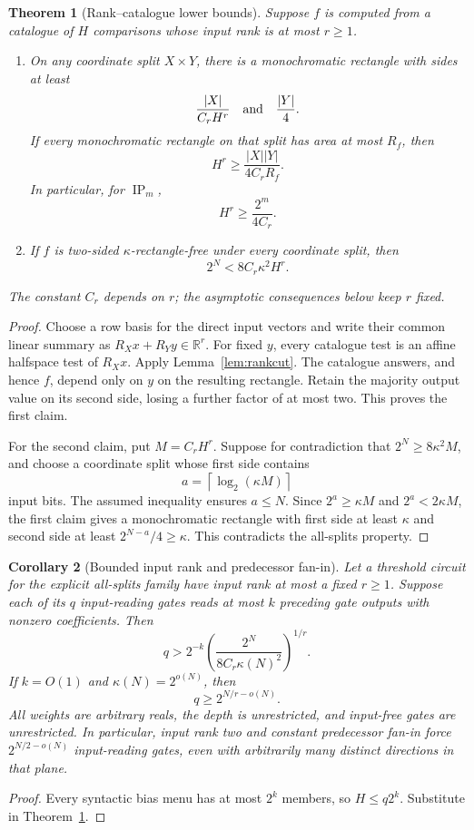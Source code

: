 \documentclass[11pt]{article}
\newtheorem{theorem}{Theorem}[section]
\newtheorem{corollary}[theorem]{Corollary}
\theoremstyle{definition}
\newcommand{\R}{\mathbb R}
\newcommand{\ip}{\operatorname{IP}}
\begin{document}
\begin{theorem}[Rank--catalogue lower bounds]\label{thm:rankcatalogue}
Suppose \(f\) is computed from a catalogue of \(H\) comparisons whose input rank is at most \(r\ge1\).
\begin{enumerate}
 \item On any coordinate split \(X\times Y\), there is a monochromatic rectangle with sides at least
 \[
 \frac{|X|}{C_rH^r}\quad\hbox{and}\quad\frac{|Y|}{4}.
 \]
 If every monochromatic rectangle on that split has area at most \(R_f\), then
 \[
 H^r\ge\frac{|X||Y|}{4C_rR_f}.
 \]
 In particular, for \(\ip_m\),
 \[
 H^r\ge\frac{2^m}{4C_r}.
 \]
 \item If \(f\) is two-sided \(\kappa\)-rectangle-free under every coordinate split, then
 \[
 \boxed{\quad 2^N<8C_r\kappa^2H^r.\quad}
 \]
\end{enumerate}
The constant \(C_r\) depends on \(r\); the asymptotic consequences below keep \(r\) fixed.
\end{theorem}
\begin{proof}
Choose a row basis for the direct input vectors and write their common linear summary as \(R_Xx+R_Yy\in\R^r\). For fixed \(y\), every catalogue test is an affine halfspace test of \(R_Xx\). Apply Lemma~\ref{lem:rankcut}. The catalogue answers, and hence \(f\), depend only on \(y\) on the resulting rectangle. Retain the majority output value on its second side, losing a further factor of at most two. This proves the first claim.

For the second claim, put \(M=C_rH^r\). Suppose for contradiction that \(2^N\ge8\kappa^2M\), and choose a coordinate split whose first side contains
\[
 a=\left\lceil\log_2(\kappa M)\right\rceil
\]
input bits. The assumed inequality ensures \(a\le N\). Since \(2^a\ge\kappa M\) and \(2^a<2\kappa M\), the first claim gives a monochromatic rectangle with first side at least \(\kappa\) and second side at least \(2^{N-a}/4\ge\kappa\). This contradicts the all-splits property.
\end{proof}

\begin{corollary}[Bounded input rank and predecessor fan-in]\label{cor:rankfanin}
Let a threshold circuit for the explicit all-splits family have input rank at most a fixed \(r\ge1\). Suppose each of its \(q\) input-reading gates reads at most \(k\) preceding gate outputs with nonzero coefficients. Then
\[
 q>2^{-k}\left(\frac{2^N}{8C_r\kappa(N)^2}\right)^{1/r}.
\]
If \(k=O(1)\) and \(\kappa(N)=2^{o(N)}\), then
\[
 \boxed{\quad q\ge2^{N/r-o(N)}.\quad}
\]
All weights are arbitrary reals, the depth is unrestricted, and input-free gates are unrestricted. In particular, input rank two and constant predecessor fan-in force \(2^{N/2-o(N)}\) input-reading gates, even with arbitrarily many distinct directions in that plane.
\end{corollary}
\begin{proof}
Every syntactic bias menu has at most \(2^k\) members, so \(H\le q2^k\). Substitute in Theorem~\ref{thm:rankcatalogue}.
\end{proof}
\end{document}
